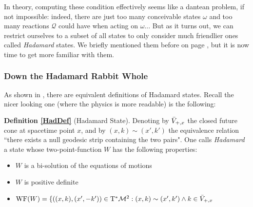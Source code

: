 \documentclass[a4paper,11pt]{article}
\numberwithin{equation}{section}
\theoremstyle{definition}
\begin{document}
In theory, computing these condition effectively seems like a dantean problem, if not impossible: indeed, there are just too many conceivable states $\omega$ and too many reactions $\mathcal{Q}$ could have when acting on $\omega$... But as it turns out, we can restrict ourselves to a subset of all states to only consider much friendlier ones called \emph{Hadamard} states. We briefly mentioned them before on page \pageref{FirstMentionHad}, but it is now time to get more familiar with them.
\subsubsection{Down the Hadamard Rabbit Whole} \label{DefHad}
As shown in \cite{HadEquiv}, there are equivalent definitions of Hadamard states. Recall the nicer looking one (where the physics is more readable) is the following:

\noindent \textbf{Definition \ref{HadDef}} (Hadamard State).
    Denoting by $\Bar{V}_{+,x}$ the closed future cone at spacetime point $x$, and by $(x,k)\sim(x',k')$ the equivalence relation ``there exists a null geodesic strip containing the two pairs". One calls \emph{Hadamard} a state whose two-point-function $W$ has the following properties:
    \begin{itemize}
        \item $W$ is a bi-solution of the equations of motions
        \item $W$ is positive definite
        \item $\mathrm{WF}(W)=\{ ((x,k),(x',-k'))\in \mathrm{T}^*\mathcal{M}^2 : (x,k)\sim(x',k')\wedge k \in \Bar{V}_{+,x}$
    \end{itemize}
\end{document}
